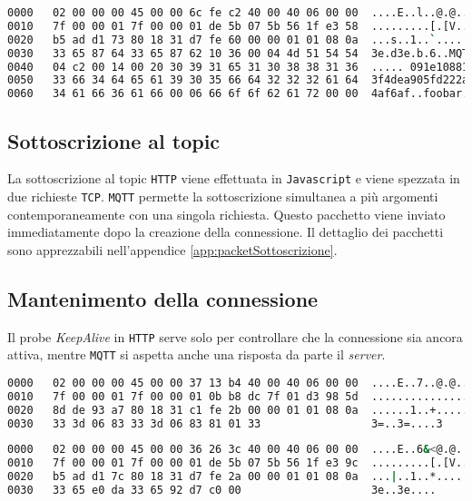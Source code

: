 \begin{lstlisting}[language=bash, label={lst:packetCreazioneMqtt}, captionpos=b, caption={MQTT Creazione socket}, basicstyle=\scriptsize\ttfamily]
0000   02 00 00 00 45 00 00 6c fe c2 40 00 40 06 00 00  ....E..l..@.@...
0010   7f 00 00 01 7f 00 00 01 de 5b 07 5b 56 1f e3 58  .........[.[V..X
0020   b5 ad d1 73 80 18 31 d7 fe 60 00 00 01 01 08 0a  ...s..1..`......
0030   33 65 87 64 33 65 87 62 10 36 00 04 4d 51 54 54  3e.d3e.b.6..MQTT
0040   04 c2 00 14 00 20 30 39 31 65 31 30 38 38 31 36  ..... 091e108816
0050   33 66 34 64 65 61 39 30 35 66 64 32 32 32 61 64  3f4dea905fd222ad
0060   34 61 66 36 61 66 00 06 66 6f 6f 62 61 72 00 00  4af6af..foobar..
\end{lstlisting}

\subsection{Sottoscrizione al topic}
\label{sub:packetSottoscrizione}

La sottoscrizione al topic \verb+HTTP+ viene effettuata in \verb+Javascript+ e viene spezzata in due richieste \verb+TCP+.
\verb+MQTT+ permette la sottoscrizione simultanea a più argomenti contemporaneamente con una singola richiesta.
Questo pacchetto viene inviato immediatamente dopo la creazione della connessione.
Il dettaglio dei pacchetti sono apprezzabili nell'appendice \ref{app:packetSottoscrizione}.

\subsection{Mantenimento della connessione}
\label{sub:packetMantenimento}

Il probe \textit{KeepAlive} in \verb+HTTP+ serve solo per controllare che la connessione sia ancora attiva, mentre \verb+MQTT+ si aspetta anche una risposta da parte il \textit{server}.

\begin{lstlisting}[language=bash, label={lst:packetMantenimentoHttq}, captionpos=b, caption={HTTP Probe KeepAlive}, basicstyle=\scriptsize\ttfamily]
0000   02 00 00 00 45 00 00 37 13 b4 40 00 40 06 00 00  ....E..7..@.@...
0010   7f 00 00 01 7f 00 00 01 0b b8 dc 7f 01 d3 98 5d  ...............]
0020   8d de 93 a7 80 18 31 c1 fe 2b 00 00 01 01 08 0a  ......1..+......
0030   33 3d 06 83 33 3d 06 83 81 01 33                 3=..3=....3
\end{lstlisting}

\begin{lstlisting}[language=bash, label={lst:packetMantenimentoMqtt}, captionpos=b, caption={MQTT Probe KeepAlive}, basicstyle=\scriptsize\ttfamily]
0000   02 00 00 00 45 00 00 36 26 3c 40 00 40 06 00 00  ....E..6&<@.@...
0010   7f 00 00 01 7f 00 00 01 de 5b 07 5b 56 1f e3 9c  .........[.[V...
0020   b5 ad d1 7c 80 18 31 d7 fe 2a 00 00 01 01 08 0a  ...|..1..*......
0030   33 65 e0 da 33 65 92 d7 c0 00                    3e..3e....
\end{lstlisting}

